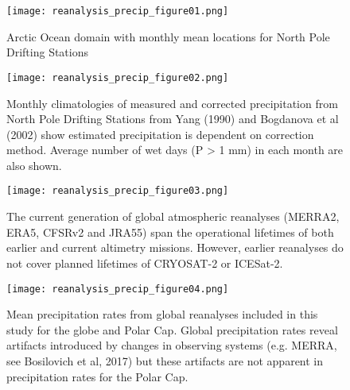 \documentclass{article}
\begin{document}
\begin{figure}[h!]
  \texttt{[image: reanalysis\_precip\_figure01.png]}
  \caption{Arctic Ocean domain with monthly mean locations for North Pole
    Drifting Stations}
\end{figure}

\newpage

\begin{figure}[h!]
  \texttt{[image: reanalysis\_precip\_figure02.png]}
  \caption{Monthly climatologies of measured and corrected precipitation
    from North Pole Drifting Stations from Yang (1990) and Bogdanova et al
    (2002) show estimated precipitation is dependent on correction method.
    Average number of wet days (P > 1 mm) in each month are also shown.}
\end{figure}

\newpage

\begin{figure}[h!]
  \texttt{[image: reanalysis\_precip\_figure03.png]}
  \caption{The current generation of global atmospheric reanalyses (MERRA2,
    ERA5, CFSRv2 and JRA55) span the operational lifetimes of both earlier
    and current altimetry missions.  However, earlier reanalyses do not
    cover planned lifetimes of CRYOSAT-2 or ICESat-2.}
\end{figure}

\newpage

\begin{figure}[h!]
  \texttt{[image: reanalysis\_precip\_figure04.png]}
  \caption{Mean precipitation rates from global reanalyses included in this
    study for the globe and Polar Cap.  Global precipitation rates reveal
    artifacts introduced by changes in observing systems (e.g. MERRA, see
    Bosilovich et al, 2017) but these artifacts are not apparent in
    precipitation rates for the Polar Cap.}
\end{figure}

\newpage
\end{document}
